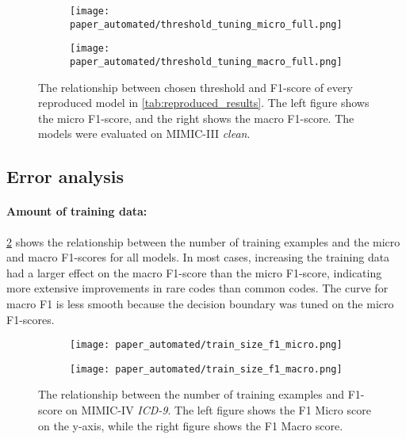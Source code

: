 {\begin{figure}
    \centering
    \begin{subfigure}[b]{0.9\textwidth}
        \centering
        \texttt{[image: paper\_automated/threshold\_tuning\_micro\_full.png]}
    \end{subfigure}
    \begin{subfigure}[b]{0.9\textwidth}
        \centering
        \texttt{[image: paper\_automated/threshold\_tuning\_macro\_full.png]}
    \end{subfigure}%
    \caption[Relationship between chosen threshold and F1-score of every reproduced model.]{The relationship between chosen threshold and F1-score of every reproduced model in \cref{tab:reproduced_results}. The left figure shows the micro F1-score, and the right shows the macro F1-score. The models were evaluated on MIMIC-III \textit{clean}.}
    \label{fig:threshold_tuning}
\end{figure}


\subsection{Error analysis}

\paragraph{Amount of training data:}

\cref{fig:train_size} shows the relationship between the number of training examples and the micro and macro F1-scores for all models.
In most cases, increasing the training data had a larger effect on the macro F1-score than the micro F1-score, indicating more extensive improvements in rare codes than common codes. The curve for macro F1 is less smooth because the decision boundary was tuned on the micro F1-scores.

\begin{figure}
    \centering
    \begin{subfigure}[b]{0.95\textwidth}
        \centering
        \texttt{[image: paper\_automated/train\_size\_f1\_micro.png]}
    \end{subfigure}
    \begin{subfigure}[b]{0.95\textwidth}
        \centering
        \texttt{[image: paper\_automated/train\_size\_f1\_macro.png]}
    \end{subfigure}
    \caption[The relationship between the number of training examples and F1-score on MIMIC-IV \textit{ICD-9}.]{The relationship between the number of training examples and F1-score on MIMIC-IV \textit{ICD-9}. The left figure shows the F1 Micro score on the y-axis, while the right figure shows the F1 Macro score.}
    \label{fig:train_size}
\end{figure}


}
